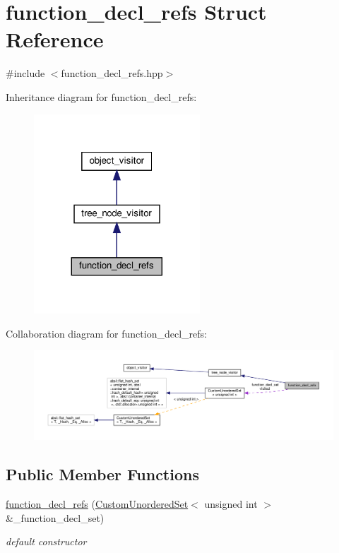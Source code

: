 \hypertarget{structfunction__decl__refs}{}\section{function\+\_\+decl\+\_\+refs Struct Reference}
\label{structfunction__decl__refs}


{\ttfamily \#include $<$function\+\_\+decl\+\_\+refs.\+hpp$>$}



Inheritance diagram for function\+\_\+decl\+\_\+refs\+:
\nopagebreak
\begin{figure}[H]
\begin{center}
\leavevmode
\includegraphics[width=176pt]{d2/d1d/structfunction__decl__refs__inherit__graph}
\end{center}
\end{figure}


Collaboration diagram for function\+\_\+decl\+\_\+refs\+:
\nopagebreak
\begin{figure}[H]
\begin{center}
\leavevmode
\includegraphics[width=350pt]{d9/d3e/structfunction__decl__refs__coll__graph}
\end{center}
\end{figure}
\subsection*{Public Member Functions}
\begin{DoxyCompactItemize}
\item 
\hyperlink{structfunction__decl__refs_ab875e24a355633ca74fc7aec582f1ed5}{function\+\_\+decl\+\_\+refs} (\hyperlink{classCustomUnorderedSet}{Custom\+Unordered\+Set}$<$ unsigned int $>$ \&\+\_\+function\+\_\+decl\+\_\+set)
\begin{DoxyCompactList}\small\item\em default constructor \end{DoxyCompactList}\end{DoxyCompactItemize}

